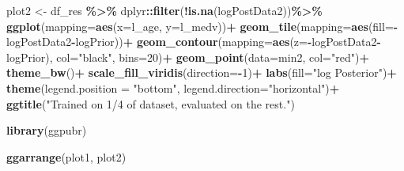 \documentclass[
]{article}
\newenvironment{Shaded}{\begin{snugshade}}{\end{snugshade}}
\newcommand{\AttributeTok}[1]{\textcolor[rgb]{0.13,0.29,0.53}{#1}}
\newcommand{\DecValTok}[1]{\textcolor[rgb]{0.00,0.00,0.81}{#1}}
\newcommand{\FunctionTok}[1]{\textcolor[rgb]{0.13,0.29,0.53}{\textbf{#1}}}
\newcommand{\NormalTok}[1]{#1}
\newcommand{\OtherTok}[1]{\textcolor[rgb]{0.56,0.35,0.01}{#1}}
\newcommand{\SpecialCharTok}[1]{\textcolor[rgb]{0.81,0.36,0.00}{\textbf{#1}}}
\newcommand{\StringTok}[1]{\textcolor[rgb]{0.31,0.60,0.02}{#1}}
\begin{document}
\begin{Shaded}
\begin{Highlighting}[]
\NormalTok{plot2 }\OtherTok{\textless{}{-}}\NormalTok{ df\_res }\SpecialCharTok{\%\textgreater{}\%}
\NormalTok{  dplyr}\SpecialCharTok{::}\FunctionTok{filter}\NormalTok{(}\SpecialCharTok{!}\FunctionTok{is.na}\NormalTok{(logPostData2))}\SpecialCharTok{\%\textgreater{}\%}
  \FunctionTok{ggplot}\NormalTok{(}\AttributeTok{mapping=}\FunctionTok{aes}\NormalTok{(}\AttributeTok{x=}\NormalTok{l\_age, }\AttributeTok{y=}\NormalTok{l\_medv))}\SpecialCharTok{+}
  \FunctionTok{geom\_tile}\NormalTok{(}\AttributeTok{mapping=}\FunctionTok{aes}\NormalTok{(}\AttributeTok{fill=}\SpecialCharTok{{-}}\NormalTok{logPostData2}\SpecialCharTok{{-}}\NormalTok{logPrior))}\SpecialCharTok{+}
  \FunctionTok{geom\_contour}\NormalTok{(}\AttributeTok{mapping=}\FunctionTok{aes}\NormalTok{(}\AttributeTok{z=}\SpecialCharTok{{-}}\NormalTok{logPostData2}\SpecialCharTok{{-}}\NormalTok{logPrior), }\AttributeTok{col=}\StringTok{"black"}\NormalTok{, }\AttributeTok{bins=}\DecValTok{20}\NormalTok{)}\SpecialCharTok{+}
  \FunctionTok{geom\_point}\NormalTok{(}\AttributeTok{data=}\NormalTok{min2, }\AttributeTok{col=}\StringTok{"red"}\NormalTok{)}\SpecialCharTok{+}
  \FunctionTok{theme\_bw}\NormalTok{()}\SpecialCharTok{+}
  \FunctionTok{scale\_fill\_viridis}\NormalTok{(}\AttributeTok{direction=}\SpecialCharTok{{-}}\DecValTok{1}\NormalTok{)}\SpecialCharTok{+}
  \FunctionTok{labs}\NormalTok{(}\AttributeTok{fill=}\StringTok{"log Posterior"}\NormalTok{)}\SpecialCharTok{+}
  \FunctionTok{theme}\NormalTok{(}\AttributeTok{legend.position =} \StringTok{"bottom"}\NormalTok{,}
        \AttributeTok{legend.direction=}\StringTok{"horizontal"}\NormalTok{)}\SpecialCharTok{+}
  \FunctionTok{ggtitle}\NormalTok{(}\StringTok{"Trained on 1/4 of dataset, evaluated on the rest."}\NormalTok{)}

\FunctionTok{library}\NormalTok{(ggpubr)}

\FunctionTok{ggarrange}\NormalTok{(plot1, plot2)}
\end{Highlighting}
\end{Shaded}
\end{document}
